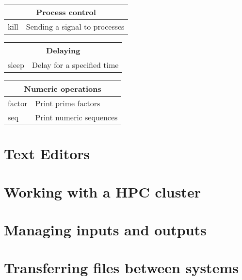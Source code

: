 \begin{tabularx}{0.75\textwidth}{|l|X|}
\hline
\multicolumn{2}{|c|}{Process control}\\ \hline
kill  &               Sending a signal to processes\\
\hline
\end{tabularx}

\begin{tabularx}{0.75\textwidth}{|l|X|}
\hline
\multicolumn{2}{|c|}{Delaying}\\ \hline
sleep  &              Delay for a specified time\\
\hline
\end{tabularx}

\begin{tabularx}{0.75\textwidth}{|l|X|}
\hline
\multicolumn{2}{|c|}{Numeric operations}\\ \hline
factor  &             Print prime factors\\
seq  &                Print numeric sequences\\
\hline
\end{tabularx} 


\section{Text Editors}
\section{Working with a HPC cluster}
\section{Managing inputs and outputs}
\section{Transferring files between systems}


